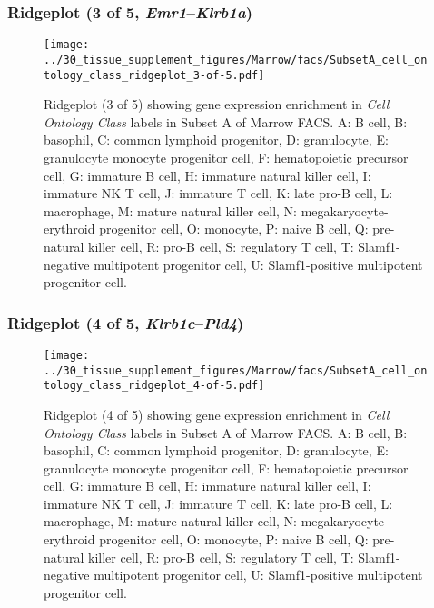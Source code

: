 \subsubsection{Ridgeplot (3 of 5, \emph{Emr1}--\emph{Klrb1a})}
\begin{figure}[h]
\centering
\texttt{[image: ../30\_tissue\_supplement\_figures/Marrow/facs/SubsetA\_cell\_ontology\_class\_ridgeplot\_3-of-5.pdf]}

\caption{ Ridgeplot (3 of 5)  showing gene expression enrichment in \emph{Cell Ontology Class} labels in Subset A of Marrow FACS. A: B cell, B: basophil, C: common lymphoid progenitor, D: granulocyte, E: granulocyte monocyte progenitor cell, F: hematopoietic precursor cell, G: immature B cell, H: immature natural killer cell, I: immature NK T cell, J: immature T cell, K: late pro-B cell, L: macrophage, M: mature natural killer cell, N: megakaryocyte-erythroid progenitor cell, O: monocyte, P: naive B cell, Q: pre-natural killer cell, R: pro-B cell, S: regulatory T cell, T: Slamf1-negative multipotent progenitor cell, U: Slamf1-positive multipotent progenitor cell.}
\end{figure}


\clearpage

\subsubsection{Ridgeplot (4 of 5, \emph{Klrb1c}--\emph{Pld4})}
\begin{figure}[h]
\centering
\texttt{[image: ../30\_tissue\_supplement\_figures/Marrow/facs/SubsetA\_cell\_ontology\_class\_ridgeplot\_4-of-5.pdf]}

\caption{ Ridgeplot (4 of 5)  showing gene expression enrichment in \emph{Cell Ontology Class} labels in Subset A of Marrow FACS. A: B cell, B: basophil, C: common lymphoid progenitor, D: granulocyte, E: granulocyte monocyte progenitor cell, F: hematopoietic precursor cell, G: immature B cell, H: immature natural killer cell, I: immature NK T cell, J: immature T cell, K: late pro-B cell, L: macrophage, M: mature natural killer cell, N: megakaryocyte-erythroid progenitor cell, O: monocyte, P: naive B cell, Q: pre-natural killer cell, R: pro-B cell, S: regulatory T cell, T: Slamf1-negative multipotent progenitor cell, U: Slamf1-positive multipotent progenitor cell.}
\end{figure}


\clearpage

